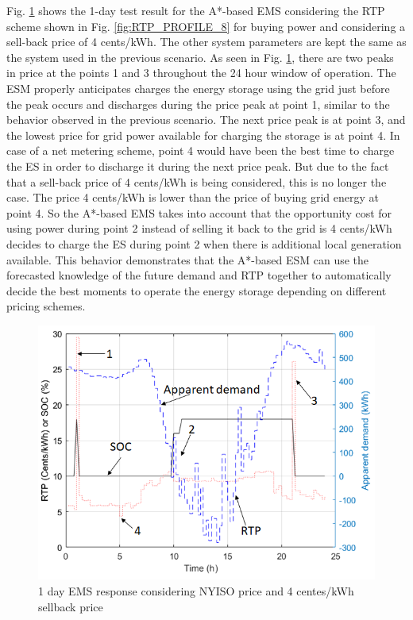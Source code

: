 Fig. \ref{fig:VAR_1_day_example} shows the 1-day test result for the A*-based EMS considering the RTP scheme shown in Fig. \ref{fig:RTP_PROFILE_8} for buying power and considering a sell-back price of 4 cents/kWh. The other system parameters are kept the same as the system used in the previous scenario. As seen in Fig. \ref{fig:VAR_1_day_example}, there are two peaks in price at the points 1 and 3 throughout the 24 hour window of operation. The ESM properly anticipates charges the energy storage using the grid just before the peak occurs and discharges during the price peak at point 1, similar to the behavior observed in the previous scenario. The next price peak is at point 3, and the lowest price for grid power available for charging the storage is at point 4. In case of a net metering scheme, point 4 would have been the best time to charge the ES in order to discharge it during the next price peak. But due to the fact that a sell-back price of 4 cents/kWh is being considered, this is no longer the case. The price 4 cents/kWh is lower than the price of buying grid energy at point 4. So the A*-based EMS takes into account that the opportunity cost for using power during point 2 instead of selling it back to the grid is 4 cents/kWh decides to charge the ES during point 2 when there is additional local generation available. This behavior demonstrates that the A*-based ESM can use the forecasted knowledge of the future demand and RTP together to automatically decide the best moments to operate the energy storage depending on different pricing schemes.

 \begin{figure}[!ht]
    \centering
    \includegraphics[width = 0.8\linewidth]{figs/VAR_1_day_example.png}
    \caption{1 day EMS response considering NYISO price and 4 centes/kWh sellback price}
    \label{fig:VAR_1_day_example}
\end{figure}

